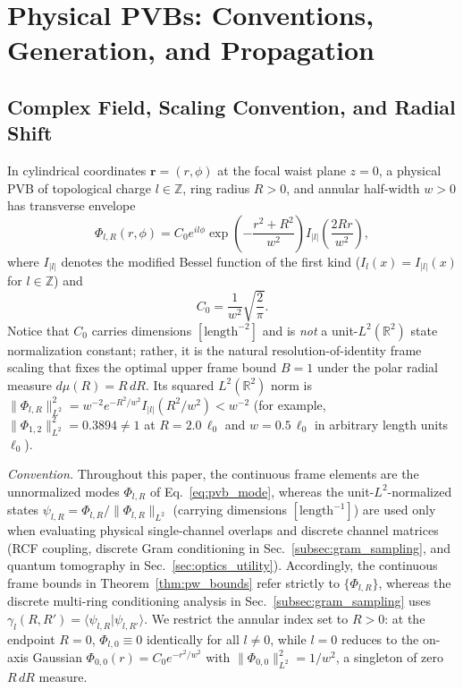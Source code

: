 \documentclass[aps,pra,onecolumn,notitlepage,11pt,tightenlines,amsmath,amssymb,floatfix,longbibliography]{revtex4-2}
\providecommand{\braket}[2]{\langle#1\vert#2\rangle}
\providecommand{\abs}[1]{\lvert#1\rvert}
\providecommand{\norm}[1]{\lVert#1\rVert}
\begin{document}
\section{Physical PVBs: Conventions, Generation, and Propagation}
\label{sec:pvb_formation}

\subsection{Complex Field, Scaling Convention, and Radial Shift}
\label{subsec:pvb_def}

In cylindrical coordinates $\mathbf{r} = (r,\phi)$ at the focal waist plane $z = 0$, a physical PVB of topological charge $l \in \mathbb{Z}$, ring radius $R > 0$, and annular half-width $w > 0$ has transverse envelope~\cite{Ostrovsky2013,Vaity2015}
\begin{equation}
\Phi_{l,R}(r,\phi) = C_0 e^{il\phi} \exp\!\left(-\frac{r^2 + R^2}{w^2}\right) I_{\abs{l}}\!\left(\frac{2Rr}{w^2}\right),
\label{eq:pvb_mode}
\end{equation}
where $I_{\abs{l}}$ denotes the modified Bessel function of the first kind ($I_l(x) = I_{\abs{l}}(x)$ for $l \in \mathbb{Z}$) and
\begin{equation}
C_0 = \frac{1}{w^2}\sqrt{\frac{2}{\pi}}.
\label{eq:C0_norm}
\end{equation}
Notice that $C_0$ carries dimensions $[\mathrm{length}^{-2}]$ and is \emph{not} a unit-$L^2(\mathbb{R}^2)$ state normalization constant; rather, it is the natural resolution-of-identity frame scaling that fixes the optimal upper frame bound $B = 1$ under the polar radial measure $d\mu(R) = R\,dR$. Its squared $L^2(\mathbb{R}^2)$ norm is $\norm{\Phi_{l,R}}_{L^2}^2 = w^{-2} e^{-R^2/w^2} I_{\abs{l}}(R^2/w^2) < w^{-2}$ (for example, $\norm{\Phi_{1,2}}_{L^2}^2 = 0.3894 \neq 1$ at $R = 2.0\,\ell_0$ and $w = 0.5\,\ell_0$ in arbitrary length units $\ell_0$).

\emph{Convention.} Throughout this paper, the continuous frame elements are the unnormalized modes $\Phi_{l,R}$ of Eq.~\eqref{eq:pvb_mode}, whereas the unit-$L^2$-normalized states $\psi_{l,R} = \Phi_{l,R}/\norm{\Phi_{l,R}}_{L^2}$ (carrying dimensions $[\mathrm{length}^{-1}]$) are used only when evaluating physical single-channel overlaps and discrete channel matrices (RCF coupling, discrete Gram conditioning in Sec.~\ref{subsec:gram_sampling}, and quantum tomography in Sec.~\ref{sec:optics_utility}). Accordingly, the continuous frame bounds in Theorem~\ref{thm:pw_bounds} refer strictly to $\{\Phi_{l,R}\}$, whereas the discrete multi-ring conditioning analysis in Sec.~\ref{subsec:gram_sampling} uses $\gamma_l(R,R') = \braket{\psi_{l,R}}{\psi_{l,R'}}$. We restrict the annular index set to $R > 0$: at the endpoint $R = 0$, $\Phi_{l,0} \equiv 0$ identically for all $l \neq 0$, while $l = 0$ reduces to the on-axis Gaussian $\Phi_{0,0}(r) = C_0 e^{-r^2/w^2}$ with $\norm{\Phi_{0,0}}_{L^2}^2 = 1/w^2$, a singleton of zero $R\,dR$ measure.
\end{document}
